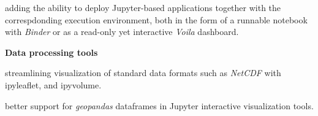 \begin{task}[
  title=Demonstrator: Geosciences,
  id=geoscience,
  lead=UIO,
  PM=25,
  wphases={0-48},
  partners={EGI,QS,SRL,UPSUD}
]
\begin{compactitem}
  \item adding the ability to deploy Jupyter-based applications together with
    the correspdonding execution environment, both in the form of a runnable
    notebook with \emph{Binder} or as a read-only yet interactive \emph{Voila}
    dashboard.
\end{compactitem}

\textbf{Data processing tools}

\begin{compactitem}
  \item streamlining visualization of standard data formats such as \emph{NetCDF}
  with ipyleaflet, and ipyvolume.

  \item better support for \emph{geopandas} dataframes in Jupyter interactive
  visualization tools.
\end{compactitem}
\end{task}
